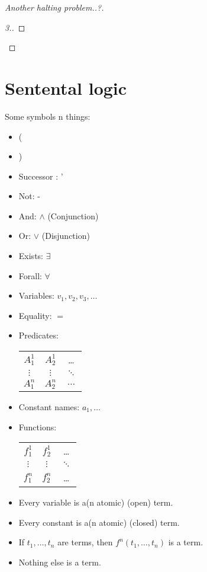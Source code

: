 \begin{proof}[Another halting problem..?]
\begin{proof}[3.]
\end{proof}
\end{proof}


\section{Sentental logic}
Some symbols n things:
\begin{itemize}
\item ( 
\item ) 
\item Successor : ' %
\item Not: -
\item And: $\wedge$ (Conjunction)
\item Or: $\vee$ (Disjunction)
\item Exists: $\exists$ 
\item Forall: $\forall$
\item Variables: $v_1, v_2, v_3, \dots$
\item Equality: $=$
\item Predicates: \begin{tabular}{c c c}
 $A^{1}_1$ & $A^{1}_2$  & \dots \\
 $\vdots $ & $\vdots$   & $\ddots$ \\
 $A^{n}_1$ & $A^{n}_2$  & $\dots$ \\
\end{tabular}
\item Constant names: $a_1, \dots$
\item Functions: \begin{tabular}{c c c}
 $f^{1}_1$ & $f^{1}_2$ & \dots \\
 $\vdots$    & $\vdots$ & $\ddots$ \\
 $f^{n}_1$ & $f^{n}_2$ & \dots \\
\end{tabular}
\end{itemize}


\begin{definition}[Term]
\begin{itemize}
\item Every variable is a(n atomic) (open) term.
\item Every constant is a(n atomic) (closed) term. %
\item If $t_1,\dots,t_n$ are terms, then $f^n(t_1,\dots,t_n)$ is a term.  
\item Nothing else is a term.
\end{itemize}
\end{definition}

